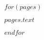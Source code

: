 \documentclass{article}
\begin{document}
$for(pages)$

    \vspace*{\fill}

    \begin{mdframed}[style=textbox]
    \fontsize{18pt}{22pt}\selectfont %
    $pages.text$
    \end{mdframed}

    \vspace*{0.05\textheight}

    \newpage
$endfor$
\end{document}
